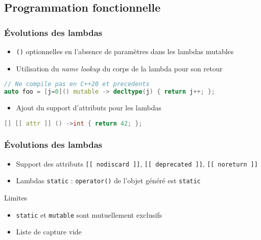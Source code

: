 \documentclass[C++.tex]{subfiles}
\begin{document}
\subsection*{Programmation fonctionnelle}
\begin{frame}[fragile]
	\frametitle{Évolutions des lambdas}
	\begin{itemize}
		\item \lstinline|()| optionnelles en l'absence de paramètres dans les lambdas mutables


		\item Utilisation du \textit{name lookup} du corps de la lambda pour son retour
	\end{itemize}

	\begin{lstlisting}[language=C++]
// Ne compile pas en C++20 et precedents
auto foo = [j=0]() mutable -> decltype(j) { return j++; };\end{lstlisting}


	\begin{itemize}
		\item Ajout du support d'attributs pour les lambdas
	\end{itemize}

	\begin{lstlisting}[language=C++]
[] [[ attr ]] () ->int { return 42; };\end{lstlisting}
\end{frame}

\begin{frame}[fragile]
	\frametitle{Évolutions des lambdas}
	\begin{itemize}
		\item Support des attributs \lstinline|[[ nodiscard ]]|, \lstinline|[[ deprecated ]]|, \lstinline|[[ noreturn ]]|
		\item Lambdas \lstinline|static| : \lstinline|operator()| de l'objet généré est \lstinline|static|
	\end{itemize}
	
	\begin{alertblock}{Limites}
		\begin{itemize}
			\item \lstinline|static| et \lstinline|mutable| sont mutuellement exclusifs
			\item Liste de capture vide
		\end{itemize}
	\end{alertblock}
\end{frame}
\end{document}

